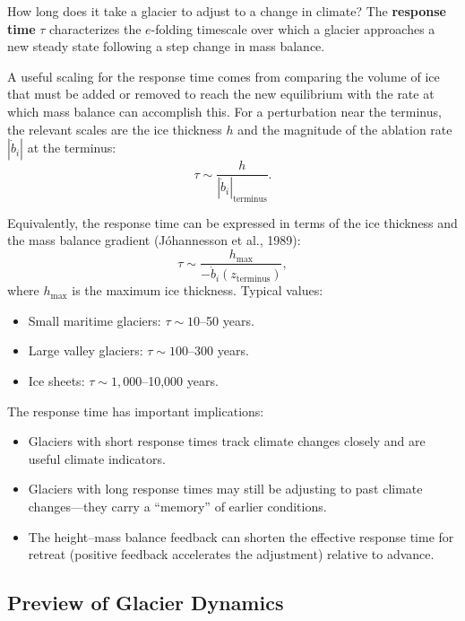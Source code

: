 \documentclass[11pt]{article}
\begin{document}
How long does it take a glacier to adjust to a change in climate?  The \textbf{response time} $\tau$ characterizes the $e$-folding timescale over which a glacier approaches a new steady state following a step change in mass balance.

A useful scaling for the response time comes from comparing the volume of ice that must be added or removed to reach the new equilibrium with the rate at which mass balance can accomplish this.  For a perturbation near the terminus, the relevant scales are the ice thickness $h$ and the magnitude of the ablation rate $|\dot{b}_i|$ at the terminus:
\begin{equation}
  \tau \sim \frac{h}{|\dot{b}_i|_{\text{terminus}}}.
\end{equation}

Equivalently, the response time can be expressed in terms of the ice thickness and the mass balance gradient (J\'{o}hannesson et al., 1989):
\begin{equation}
  \tau \sim \frac{h_{\max}}{-\dot{b}_i(z_{\text{terminus}})},
\end{equation}
where $h_{\max}$ is the maximum ice thickness.  Typical values:
\begin{itemize}
  \item Small maritime glaciers: $\tau \sim 10$--50 years.
  \item Large valley glaciers: $\tau \sim 100$--300 years.
  \item Ice sheets: $\tau \sim 1{,}000$--10{,}000 years.
\end{itemize}

\noindent The response time has important implications:
\begin{itemize}
  \item Glaciers with short response times track climate changes closely and are useful climate indicators.
  \item Glaciers with long response times may still be adjusting to past climate changes---they carry a ``memory'' of earlier conditions.
  \item The height--mass balance feedback can shorten the effective response time for retreat (positive feedback accelerates the adjustment) relative to advance.
\end{itemize}

\subsection{Preview of Glacier Dynamics}
\end{document}
